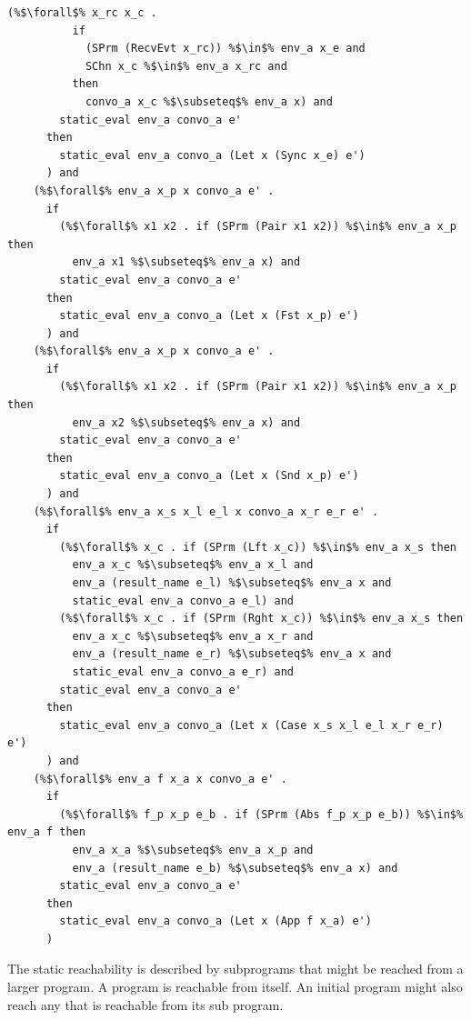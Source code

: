 \documentclass{article}
\begin{document}
\begin{lstlisting}[language=logic, escapechar=\%]
        (%$\forall$% x_rc x_c . 
          if
            (SPrm (RecvEvt x_rc)) %$\in$% env_a x_e and 
            SChn x_c %$\in$% env_a x_rc and 
          then
            convo_a x_c %$\subseteq$% env_a x) and
        static_eval env_a convo_a e'
      then
        static_eval env_a convo_a (Let x (Sync x_e) e')
      ) and
    (%$\forall$% env_a x_p x convo_a e' . 
      if
        (%$\forall$% x1 x2 . if (SPrm (Pair x1 x2)) %$\in$% env_a x_p then
          env_a x1 %$\subseteq$% env_a x) and
        static_eval env_a convo_a e'
      then
        static_eval env_a convo_a (Let x (Fst x_p) e')
      ) and
    (%$\forall$% env_a x_p x convo_a e' . 
      if
        (%$\forall$% x1 x2 . if (SPrm (Pair x1 x2)) %$\in$% env_a x_p then
          env_a x2 %$\subseteq$% env_a x) and
        static_eval env_a convo_a e'
      then
        static_eval env_a convo_a (Let x (Snd x_p) e')
      ) and
    (%$\forall$% env_a x_s x_l e_l x convo_a x_r e_r e' . 
      if
        (%$\forall$% x_c . if (SPrm (Lft x_c)) %$\in$% env_a x_s then 
          env_a x_c %$\subseteq$% env_a x_l and
          env_a (result_name e_l) %$\subseteq$% env_a x and
          static_eval env_a convo_a e_l) and
        (%$\forall$% x_c . if (SPrm (Rght x_c)) %$\in$% env_a x_s then 
          env_a x_c %$\subseteq$% env_a x_r and
          env_a (result_name e_r) %$\subseteq$% env_a x and
          static_eval env_a convo_a e_r) and
        static_eval env_a convo_a e'
      then
        static_eval env_a convo_a (Let x (Case x_s x_l e_l x_r e_r) e')
      ) and
    (%$\forall$% env_a f x_a x convo_a e' . 
      if
        (%$\forall$% f_p x_p e_b . if (SPrm (Abs f_p x_p e_b)) %$\in$% env_a f then 
          env_a x_a %$\subseteq$% env_a x_p and 
          env_a (result_name e_b) %$\subseteq$% env_a x) and
        static_eval env_a convo_a e'
      then
        static_eval env_a convo_a (Let x (App f x_a) e')
      )
  \end{lstlisting}

The static reachability is described by subprograms that might be reached from a larger
program.  A program is reachable from itself. An initial program might also reach any that is
reachable from its sub program.
\end{document}
